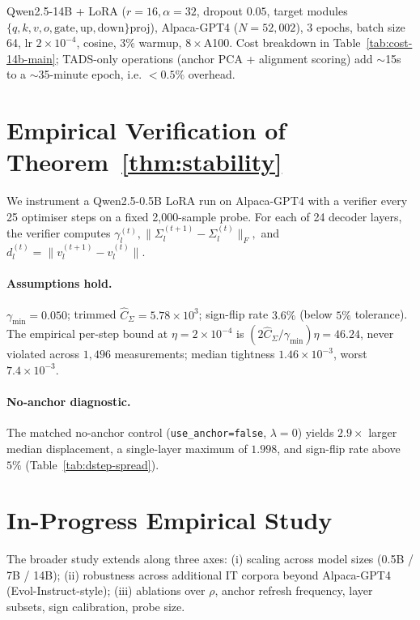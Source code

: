 Qwen2.5-14B + LoRA ($r=16, \alpha=32$, dropout $0.05$, target
modules $\{q,k,v,o,\text{gate},\text{up},\text{down}\}$proj),
Alpaca-GPT4 ($N=52{,}002$), 3 epochs, batch size 64, lr
$2\times10^{-4}$, cosine, $3\%$ warmup, $8\times$A100. Cost
breakdown in Table~\ref{tab:cost-14b-main}; \textsc{TADS}-only
operations (anchor PCA + alignment scoring) add $\sim$15s to a
$\sim$35-minute epoch, i.e. $<0.5\%$ overhead.

\section{Empirical Verification of Theorem~\ref{thm:stability}}
\label{app:thm-verification}

We instrument a Qwen2.5-0.5B LoRA run on Alpaca-GPT4 with a
verifier every 25 optimiser steps on a fixed 2{,}000-sample probe.
For each of 24 decoder layers, the verifier computes
$\gamma_l^{(t)}, \|\Sigma_l^{(t+1)}-\Sigma_l^{(t)}\|_F,$ and
$d_l^{(t)}=\|v_l^{(t+1)}-v_l^{(t)}\|$.

\paragraph{Assumptions hold.}
$\gamma_{\min}=0.050$; trimmed $\hat C_\Sigma=5.78\times10^3$;
sign-flip rate $3.6\%$ (below $5\%$ tolerance). The empirical
per-step bound at $\eta=2\times10^{-4}$ is
$(2\hat C_\Sigma / \gamma_{\min}) \eta = 46.24$, never violated
across $1{,}496$ measurements; median tightness
$1.46\times10^{-3}$, worst $7.4\times10^{-3}$.

\paragraph{No-anchor diagnostic.}
The matched no-anchor control (\texttt{use\_anchor=false},
$\lambda=0$) yields $2.9\times$ larger median displacement, a
single-layer maximum of $1.998$, and sign-flip rate above $5\%$
(Table~\ref{tab:dstep-spread}).

\section{In-Progress Empirical Study}
\label{app:inprogress}

The broader study extends along three axes: (i) scaling across
model sizes (0.5B / 7B / 14B); (ii) robustness across additional
IT corpora beyond Alpaca-GPT4 (Evol-Instruct-style); (iii)
ablations over $\rho$, anchor refresh frequency, layer subsets,
sign calibration, probe size.

